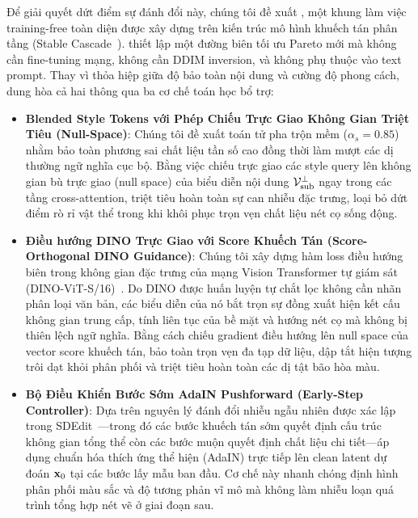\documentclass[runningheads]{llncs}
\begin{document}
Để giải quyết dứt điểm sự đánh đổi này, chúng tôi đề xuất \textbf{\method}, một khung làm việc training-free toàn diện được xây dựng trên kiến trúc mô hình khuếch tán phân tầng (Stable Cascade~\cite{wuerstchen}). \method thiết lập một đường biên tối ưu Pareto mới mà không cần fine-tuning mạng, không cần DDIM inversion, và không phụ thuộc vào text prompt. Thay vì thỏa hiệp giữa độ bảo toàn nội dung và cường độ phong cách, \method dung hòa cả hai thông qua ba cơ chế toán học bổ trợ:
\begin{itemize}
    \item \textbf{Blended Style Tokens với Phép Chiếu Trực Giao Không Gian Triệt Tiêu (Null-Space)}: Chúng tôi đề xuất toán tử pha trộn mềm ($\alpha_s = 0.85$) nhằm bảo toàn phương sai chất liệu tần số cao đồng thời làm mượt các dị thường ngữ nghĩa cục bộ. Bằng việc chiếu trực giao các style query lên không gian bù trực giao (null space) của biểu diễn nội dung $\mathcal{V}_{\text{sub}}^\perp$ ngay trong các tầng cross-attention, \method triệt tiêu hoàn toàn sự can nhiễu đặc trưng, loại bỏ dứt điểm rò rỉ vật thể trong khi khôi phục trọn vẹn chất liệu nét cọ sống động.
    \item \textbf{Điều hướng DINO Trực Giao với Score Khuếch Tán (Score-Orthogonal DINO Guidance)}: Chúng tôi xây dựng hàm loss điều hướng biên trong không gian đặc trưng của mạng Vision Transformer tự giám sát (DINO-ViT-S/16)~\cite{dino}. Do DINO được huấn luyện tự chắt lọc không cần nhãn phân loại văn bản, các biểu diễn của nó bắt trọn sự đồng xuất hiện kết cấu không gian trung cấp, tính liên tục của bề mặt và hướng nét cọ mà không bị thiên lệch ngữ nghĩa. Bằng cách chiếu gradient điều hướng lên null space của vector score khuếch tán, \method bảo toàn trọn vẹn đa tạp dữ liệu, dập tắt hiện tượng trôi dạt khỏi phân phối và triệt tiêu hoàn toàn các dị tật bão hòa màu.
    \item \textbf{Bộ Điều Khiển Bước Sớm AdaIN Pushforward (Early-Step Controller)}: Dựa trên nguyên lý đánh đổi nhiễu ngẫu nhiên được xác lập trong SDEdit~\cite{sdedit}---trong đó các bước khuếch tán sớm quyết định cấu trúc không gian tổng thể còn các bước muộn quyết định chất liệu chi tiết---\method áp dụng chuẩn hóa thích ứng thể hiện (AdaIN) trực tiếp lên clean latent dự đoán $\mathbf{x}_0$ tại các bước lấy mẫu ban đầu. Cơ chế này nhanh chóng định hình phân phối màu sắc và độ tương phản vĩ mô mà không làm nhiễu loạn quá trình tổng hợp nét vẽ ở giai đoạn sau.
\end{itemize}
\end{document}
